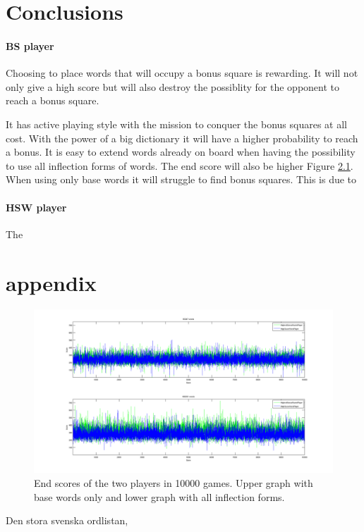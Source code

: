 \documentclass[a4paper, 12pt]{report}
\begin{document}
\chapter{Conclusions}
\subsubsection{BS player}
Choosing to place words that will occupy a bonus square is rewarding. It will not only give a high score but will also destroy the possiblity for the opponent to reach a bonus square.

It has active playing style with the mission to conquer the bonus squares at all cost. With the power of a big dictionary it will have a higher probability to reach a bonus. It is easy to extend words already on board when having the possibility to use all inflection forms of words. The end score will also be higher Figure \ref{fig:bs+hsw+totalscores}. When using only base words it will struggle to find bonus squares. This is due to 


\subsubsection{HSW player}
The 

\chapter{appendix}
\begin{figure}[h]
\centering
\includegraphics[scale=0.3]{Highest_Bonus_Round_vs_High_Score_Word_10000}
\caption {End scores of the two players in 10000 games. Upper graph with base words only and lower graph with all inflection forms.}
\label{fig:bs+hsw+totalscores}
\end{figure}

\begin{thebibliography}{100}  
Den stora svenska ordlistan, %
\end{thebibliography}
\end{document}
